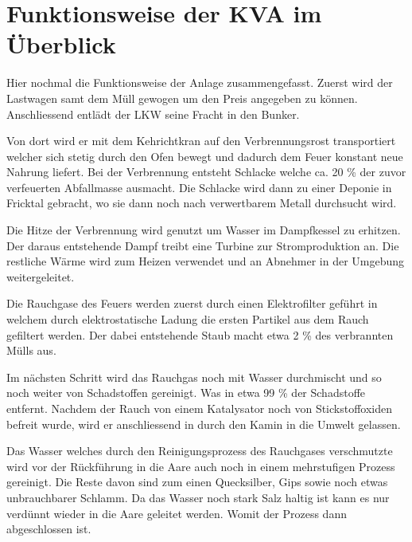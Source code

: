 \section{Funktionsweise der KVA im Überblick}
\label{sec-3}

\begin{center}
\end{center}

Hier nochmal die Funktionsweise der Anlage zusammengefasst.  Zuerst
wird der Lastwagen samt dem Müll gewogen um den Preis angegeben zu
können. Anschliessend entlädt der LKW seine Fracht in den Bunker.

Von dort wird er mit dem Kehrichtkran auf den Verbrennungsrost
transportiert welcher sich stetig durch den Ofen bewegt und dadurch
dem Feuer konstant neue Nahrung liefert. Bei der Verbrennung entsteht
Schlacke welche ca. 20 \% der zuvor verfeuerten Abfallmasse ausmacht.
Die Schlacke wird dann zu einer Deponie in Fricktal gebracht, wo sie
dann noch nach verwertbarem Metall durchsucht wird.

Die Hitze der Verbrennung wird genutzt um Wasser im Dampfkessel zu
erhitzen.  Der daraus entstehende Dampf treibt eine Turbine zur
Stromproduktion an. Die restliche Wärme wird zum Heizen verwendet und
an Abnehmer in der Umgebung weitergeleitet.

Die Rauchgase des Feuers werden zuerst durch einen Elektrofilter
geführt in welchem durch elektrostatische Ladung die ersten Partikel
aus dem Rauch gefiltert werden. Der dabei entstehende Staub macht etwa
2 \% des verbrannten Mülls aus.

Im nächsten Schritt wird das Rauchgas noch mit Wasser durchmischt und
so noch weiter von Schadstoffen gereinigt. Was in etwa 99 \% der
Schadstoffe entfernt. Nachdem der Rauch von einem Katalysator noch von
Stickstoffoxiden befreit wurde, wird er anschliessend in durch den
Kamin in die Umwelt gelassen.

Das Wasser welches durch den Reinigungsprozess des Rauchgases
verschmutzte wird vor der Rückführung in die Aare auch noch in einem
mehrstufigen Prozess gereinigt. Die Reste davon sind zum einen
Quecksilber, Gips sowie noch etwas unbrauchbarer Schlamm. Da das
Wasser noch stark Salz haltig ist kann es nur verdünnt wieder in die
Aare geleitet werden. Womit der Prozess dann abgeschlossen ist.